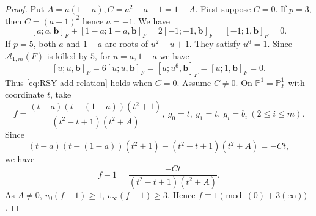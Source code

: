 \documentclass[a4paper,12pt,reqno]{amsart}
\numberwithin{equation}{section}
\theoremstyle{definition}
\newcommand{\bP}{\mathbb{P}}
\newcommand{\Acal}{\mathcal{A}}
\newcommand{\vb}{\mathbf{b}}
\begin{document}
\begin{proof}
Put $A=a(1-a), C=a^2-a+1=1-A$.
First suppose $C=0$. 
If $p=3$, then $C = (a+1)^2$ hence 
 $a=-1$. We have
\[
 [a;a,\vb]_F+[1-a;1-a,\vb]_F
 =
 2[-1;-1,\vb]_F
 =
 [-1;1,\vb]_F=0.
\]
If $p=5$, both $a$ and $1-a$ are roots of $u^2 - u+1$. 
They satisfy $u^6=1$.  
Since $\Acal_{1,m}(F)$ is killed by $5$, for $u=a,1-a$ we have
\[
 [u;u,\vb]_F
 =
 6[u;u,\vb]_F
 =
 [u;u^6,\vb]_F
 =
 [u;1,\vb]_F=0.
\]
Thus \eqref{eq:RSY-add-relation} holds when $C=0$.
Assume $C\neq0$.  On $\bP^1 = \bP_F^1$ with coordinate $t$, take
\begin{equation}\label{eq:new-RSY-function}
 f=
 \frac{(t-a)(t-(1-a))(t^2+1)}
 {(t^2-t+1)(t^2+A)},
 \ 
 g_0=t,\ g_1=t,\ g_i = b_i\ (2\leq i\leq m).
\end{equation}
Since
\[
 (t-a)(t-(1-a))(t^2+1) 
 -(t^2-t+1)(t^2+A) =
 -Ct,
\]
we have
\[
 f-1= \frac{-Ct}{(t^2-t+1)(t^2+A)}.
\]
As $A\neq0$, $v_0(f-1)\geq1$, $v_\infty(f-1)\geq3$.
Hence
$f\equiv1\pmod{(0)+3(\infty)}$. 


\end{proof}
\end{document}
